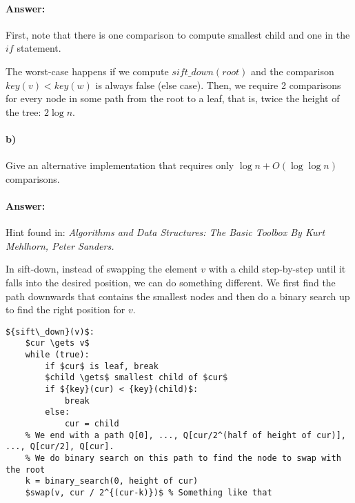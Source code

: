 \documentclass[a4paper]{article}
\begin{document}
\paragraph{Answer:} First, note that there is one comparison to compute smallest child and one in the ${if}$ statement.
 
The worst-case happens if we compute ${sift\_down}({root})$ and the comparison ${key}(v) < {key}(w)$ is always false (else case). Then, we require 2 comparisons for every node in some path from the root to a leaf, that is, twice the height of the tree:  $2 \log n$.

\paragraph{b) } Give an alternative implementation that requires only $\log n + O(\log \log n)$ comparisons.

\paragraph{Answer:}

Hint found in: \emph{Algorithms and Data Structures: The Basic Toolbox By Kurt Mehlhorn, Peter Sanders.}

In sift-down, instead of swapping the element $v$ with a child step-by-step until it falls into the desired position, we can do something different. We first find the path downwards that contains the smallest nodes and then do a binary search up to find the right position for $v$.

\begin{lstlisting}[mathescape]
${sift\_down}(v)$:
    $cur \gets v$
    while (true):
        if $cur$ is leaf, break
        $child \gets$ smallest child of $cur$
        if ${key}(cur) < {key}(child)$:
            break
        else:
            cur = child
    % We end with a path Q[0], ..., Q[cur/2^(half of height of cur)], ..., Q[cur/2], Q[cur].
    % We do binary search on this path to find the node to swap with the root
    k = binary_search(0, height of cur)
    $swap(v, cur / 2^{(cur-k)})$ % Something like that
\end{lstlisting}
\end{document}
